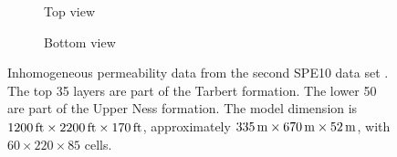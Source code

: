 \begin{figure}[ht]%
\centering%
\begin{subfigure}[b]{0.49\textwidth}%
\centering%
%
\caption{Top view}%
\label{fig:tarbert}%
\end{subfigure}%
\centering%
\begin{subfigure}[b]{0.49\textwidth}%
\centering%
%
\caption{Bottom view}%
\label{fig:upper_ness}%
\end{subfigure}%
\caption{Inhomogeneous permeability data from the second SPE10 data set \citep{spe10_2000}. The top 35 layers are part of the Tarbert formation. The lower 50 are part of the Upper Ness formation. The model dimension is  $\unit[1200]{ft} \times \unit[2200]{ft} \times \unit[170]{ft}$, approximately $\unit[335]{m} \times \unit[670]{m} \times \unit[52]{m}$, with $60\times220\times85$ cells.}%
\label{fig:spe10_perm}%
\end{figure}